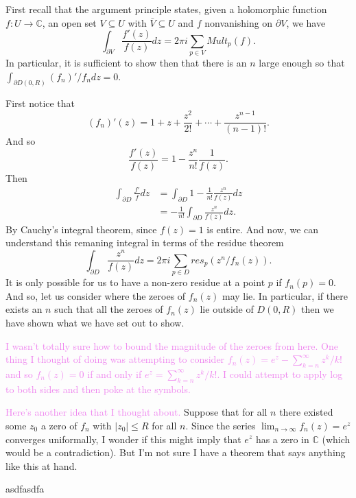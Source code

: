 \documentclass[12pt,letterpaper,boxed]{hmcpset}
\newcommand{\wg}[1]{\textcolor{violet}{#1}}
\newcommand{\C}{\mathbb C}
\newcommand{\abs}[1]{\left|#1\right|}
\begin{document}
\begin{solution}
First recall that the argument principle states, given a holomorphic
function $f: U \to \C$, an open set $V \subseteq U$ with $\bar V
\subseteq U$ and $f$ nonvanishing on $\partial V$, we have 
\[
	\int_{\partial V} \frac{f'(z)}{f(z)} dz = 2\pi i \sum_{p \in V} Mult_p(f).
\]
In particular, it is sufficient to show then that there is an $n$
large enough so that $\int_{\partial D(0,R)} (f_n)'/f_n dz = 0$. 

First notice that 
\[
	(f_n)'(z) = 1 + z + \frac{z^2}{2!} + \cdots + \frac{z^{n-1}}{(n-1)!}.
\]
And so 
\[
	\frac{f'(z)}{f(z)} = 1 - \frac{z^n}{n!} \frac{1}{f(z)}.
\]
Then
\begin{align*}
	\int_{\partial D} \frac{f'}{f} dz
	&= \int_{\partial D} 1 - \frac{1}{n!}\frac{z^n}{f(z)}dz \\
	&= -\frac{1}{n!} \int_{\partial D} \frac{z^n}{f(z)} dz.
\end{align*}
By Cauchy's integral theorem, since $f(z) = 1$ is entire. And now, we can understand this remaning
integral in terms of the residue theorem 
\[
	\int_{\partial D} \frac{z^n}{f(z)}dz = 2\pi i \sum_{p \in D} res_p(z^n/f_n(z)).
\]
It is only possible for us to have a non-zero residue at a point $p$
if $f_n(p) = 0$. And so, let us consider where the zeroes of $f_n(z)$
may lie. In particular, if there exists an $n$ such that all the
zeroes of $f_n(z)$ lie outside of $D(0,R)$ then we have shown what we
have set out to show.

\wg{I wasn't totally sure how to bound the magnitude of the zeroes
from here. One thing I thought of doing was attempting to consider
$f_n(z) = e^z - \sum_{k=n}^{\infty} z^k/k!$ and so $f_n(z) = 0$
if and only if $e^z = \sum_{k=n}^\infty z^k/ k!$. I could attempt to
apply log to both sides and then poke at the symbols. }


\wg{Here's another idea that I thought about.}
Suppose that for all $n$ there existed some $z_0$ a zero of $f_n$ with $\abs{z_0}
\leq R$ for all $n$. Since the series $\lim_{n \to \infty} f_n(z) =
e^z$ converges uniformally, I wonder if this might imply that $e^z$
has a zero in $\C$ (which would be a contradiction). But I'm not sure
I have a theorem that says anything like this at hand.

asdfasdfa

\end{solution}

\newpage

\end{document}
